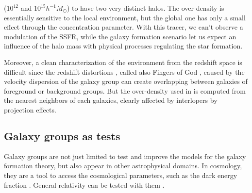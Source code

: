 ($10^{12}$ and $10^{15} h^{-1} M_\odot$) to have two very distinct halos. The
over-density is essentially sensitive to the local environment, but the global
one has only a small effect through the concentration parameter. With this
tracer, we can't observe a modulation of the SSFR\@, while the galaxy formation
scenario let us expect an influence of the halo mass with physical processes
regulating the star formation.
%

Moreover, a clean characterization of the environment from the redshift space
is difficult since the redshift distortions \citep{Jackson+72}, called also
Fingers-of-God \citep{Tully+78}, caused by the velocity dispersion of the
galaxy group can create overlapping between galaxies of foreground or
background groups. But the over-density used in \citet{Peng+10} is computed
from the nearest neighbors of each galaxies, clearly affected by interlopers by
projection effects.

\subsection{Galaxy groups as tests}
\label{sub:galaxy_groups_as_tests}

Galaxy groups are not just limited to test and improve the models for the
galaxy formation theory, but also appear in other astrophysical domains. In
cosmology, they are a tool to access the cosmological parameters, such as
the dark energy fraction \citep{Wang+98}. General relativity can be tested
with them \citep{Wojtak+11}. 

